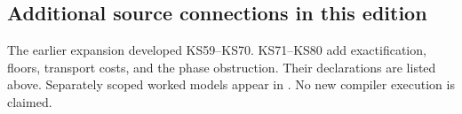 \subsection*{Additional source connections in this edition}
The earlier expansion developed KS59--KS70. KS71--KS80 add exactification, floors, transport costs, and the phase obstruction. Their declarations are listed above. Separately scoped worked models appear in . No new compiler execution is claimed.
